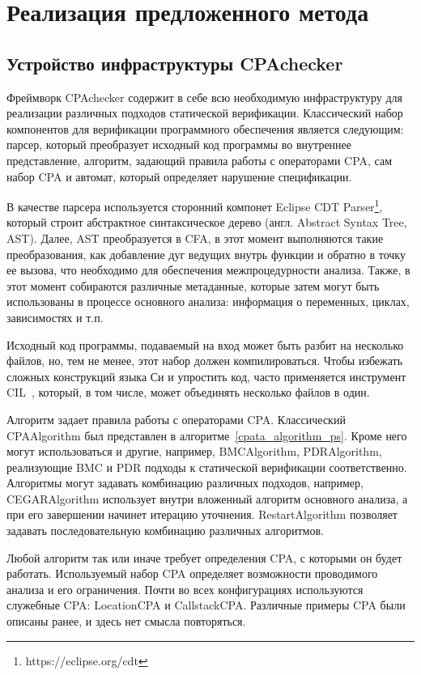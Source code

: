\chapter{Реализация предложенного метода}
\label{chapter_implementation}

\section{Устройство инфраструктуры CPAchecker}
\label{sect_impl_cpachecker}

Фреймворк CPAchecker содержит в себе всю необходимую инфраструктуру для реализации различных подходов статической верификации.
Классический набор компонентов для верификации программного обеспечения является следующим: парсер, который преобразует исходный код программы во внутреннее представление, алгоритм, задающий правила работы с операторами CPA, сам набор CPA и автомат, который определяет нарушение спецификации.

В качестве парсера используется сторонний компонет Eclipse CDT Parser\footnote{https://eclipse.org/cdt}, который строит абстрактное синтаксическое дерево (англ. Abstract Syntax Tree, AST).
Далее, AST преобразуется в CFA, в этот момент выполняются такие преобразования, как добавление дуг ведущих внутрь функции и обратно в точку ее вызова, что необходимо для обеспечения межпроцедурности анализа.
Также, в этот момент собираются различные метаданные, которые затем могут быть использованы в процессе основного анализа: информация о переменных, циклах, зависимостях и т.п.

Исходный код программы, подаваемый на вход может быть разбит на несколько файлов, но, тем не менее, этот набор должен компилироваться.
Чтобы избежать сложных конструкций языка Си и упростить код, часто применяется инструмент CIL~\cite{CIL}, который, в том числе, может объединять несколько файлов в один.

Алгоритм задает правила работы с операторами CPA. Классический CPAAlgorithm был представлен в алгоритме~\ref{cpata_algorithm_ps}.
Кроме него могут использоваться и другие, например, BMCAlgorithm, PDRAlgorithm, реализующие BMC и PDR подходы к статической верификации соответственно.
Алгоритмы могут задавать комбинацию различных подходов, например, CEGARAlgorithm использует внутри вложенный алгоритм основного анализа, а при его завершении начинет итерацию уточнения.
RestartAlgorithm позволяет задавать последовательную комбинацию различных алгоритмов.

Любой алгоритм так или иначе требует определения CPA, с которыми он будет работать.
Используемый набор CPA определяет возможности проводимого анализа и его ограничения.
Почти во всех конфигурациях используются служебные CPA: LocationCPA и CallstackCPA. 
Различные примеры CPA были описаны ранее, и здесь нет смысла повторяться.

